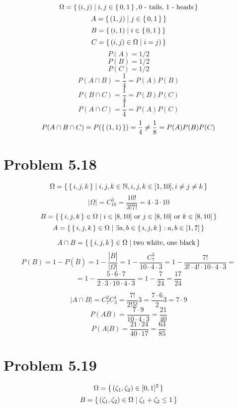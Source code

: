 \documentclass[12pt,letterpaper]{article}
\begin{document}
\[ \Omega = \set{ (i,j) \mid i,j \in \set{0,1}, \text{0 - tails, 1 - heads} } \]
\[ A = \set{(1,j) \mid j \in \set{0, 1}} \]
\[ B = \set{ (i, 1) \mid i \in \set{0, 1} } \]
\[ C = \set{ (i, j) \in \Omega \mid i = j) } \]
\[ P(A) = 1/2 \]
\[ P(B) = 1/2 \]
\[ P(C) = 1/2 \]
\[ P(A \cap B) = \frac{1}{4} = P(A)P(B) \]
\[ P(B \cap C) = \frac{1}{4} = P(B)P(C) \]
\[ P(A \cap C) = \frac{1}{4} = P(A)P(C) \]
\[ P(A \cap B \cap C) = P(\set{(1,1)}) = \frac{1}{4} \neq \frac{1}{8} = P(A)P(B)P(C) \]


\section*{Problem 5.18}

\[ \Omega = \set{ \set{i,j,k} \mid i,j,k \in \mathbb{N}, i,j,k \in [1,10], i \neq j \neq k } \]
\[ |\Omega| = C_{10}^{3} = \frac{10!}{3! 7!} = 4 \cdot 3 \cdot 10 \]
\[ B = \set{ \set{i,j,k} \in \Omega \mid i \in [8,10] \text{ or } j \in [8,10] \text{ or } k \in [8,10] } \]
\[ A = \set{ \set{i,j,k} \in \Omega \mid \exists a, b \in \set{i,j,k} : a,b \in [1,7] } \]

\[ A \cap B = \set{ \set{i,j,k} \in \Omega \mid \text{two white, one black} } \]
\[ P(B) = 1 - P(\overline B) = 1 - \frac{|\overline B|}{|\Omega|} = 1 - \frac{C_7^3}{10 \cdot 4 \cdot 3}
= 1 - \frac{7!}{3! \cdot 4! \cdot 10 \cdot 4 \cdot 3}= \]
\[ = 1 - \frac{5 \cdot 6 \cdot 7}{ 2 \cdot 3 \cdot 10 \cdot 4 \cdot 3} = 1 - \frac{7}{24} =
\frac{17}{24} \]

\[ |A \cap B| = C_{7}^2 C_3^1 = \frac{7!}{2!5!} 3 = \frac{7 \cdot 6}{2} 3 = 7 \cdot 9  \]
\[ P(AB) = \frac{7 \cdot 9}{10 \cdot 4 \cdot 3} = \frac{21}{40} \]
\[ P(A|B) = \frac{21 \cdot 24}{40 \cdot 17} = \frac{63}{85} \]



\section*{Problem 5.19}

\[ \Omega = \set{ (\zeta_1, \zeta_2) \in [0,1]^2 } \]
\[ B = \set{ (\zeta_1, \zeta_2) \in \Omega \mid \zeta_1 + \zeta_2 \leq 1 } \]

\begin{center}
\end{center}
\end{document}

